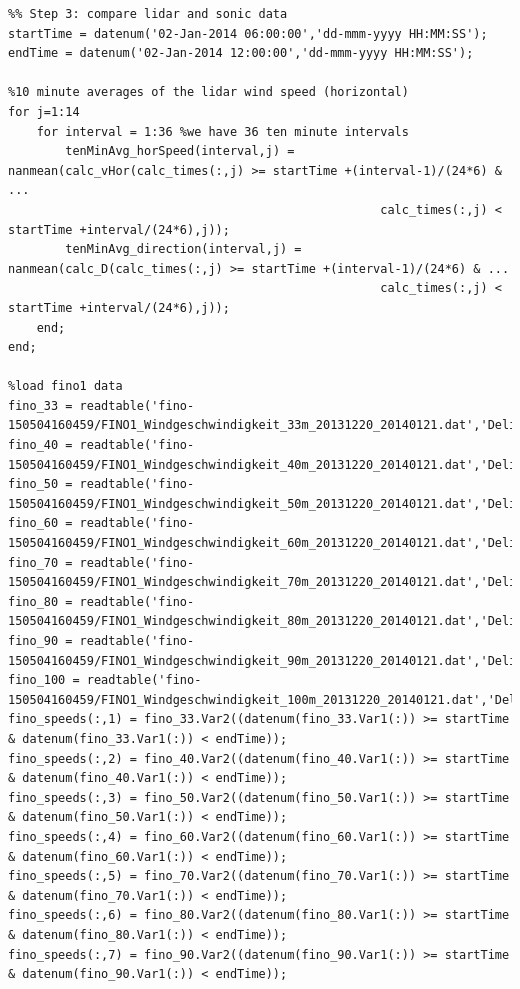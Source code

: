\documentclass[10pt]{article}
\begin{document}
\begin{lstlisting}
%% Step 3: compare lidar and sonic data
startTime = datenum('02-Jan-2014 06:00:00','dd-mmm-yyyy HH:MM:SS');
endTime = datenum('02-Jan-2014 12:00:00','dd-mmm-yyyy HH:MM:SS');

%10 minute averages of the lidar wind speed (horizontal) 
for j=1:14
    for interval = 1:36 %we have 36 ten minute intervals
        tenMinAvg_horSpeed(interval,j) = nanmean(calc_vHor(calc_times(:,j) >= startTime +(interval-1)/(24*6) & ... 
                                                    calc_times(:,j) < startTime +interval/(24*6),j));
        tenMinAvg_direction(interval,j) = nanmean(calc_D(calc_times(:,j) >= startTime +(interval-1)/(24*6) & ... 
                                                    calc_times(:,j) < startTime +interval/(24*6),j));
    end;
end;

%load fino1 data
fino_33 = readtable('fino-150504160459/FINO1_Windgeschwindigkeit_33m_20131220_20140121.dat','Delimiter','tab','HeaderLines',6);
fino_40 = readtable('fino-150504160459/FINO1_Windgeschwindigkeit_40m_20131220_20140121.dat','Delimiter','tab','HeaderLines',6);
fino_50 = readtable('fino-150504160459/FINO1_Windgeschwindigkeit_50m_20131220_20140121.dat','Delimiter','tab','HeaderLines',6);
fino_60 = readtable('fino-150504160459/FINO1_Windgeschwindigkeit_60m_20131220_20140121.dat','Delimiter','tab','HeaderLines',6);
fino_70 = readtable('fino-150504160459/FINO1_Windgeschwindigkeit_70m_20131220_20140121.dat','Delimiter','tab','HeaderLines',6);
fino_80 = readtable('fino-150504160459/FINO1_Windgeschwindigkeit_80m_20131220_20140121.dat','Delimiter','tab','HeaderLines',6);
fino_90 = readtable('fino-150504160459/FINO1_Windgeschwindigkeit_90m_20131220_20140121.dat','Delimiter','tab','HeaderLines',6);
fino_100 = readtable('fino-150504160459/FINO1_Windgeschwindigkeit_100m_20131220_20140121.dat','Delimiter','tab','HeaderLines',8);
fino_speeds(:,1) = fino_33.Var2((datenum(fino_33.Var1(:)) >= startTime & datenum(fino_33.Var1(:)) < endTime));
fino_speeds(:,2) = fino_40.Var2((datenum(fino_40.Var1(:)) >= startTime & datenum(fino_40.Var1(:)) < endTime));
fino_speeds(:,3) = fino_50.Var2((datenum(fino_50.Var1(:)) >= startTime & datenum(fino_50.Var1(:)) < endTime));
fino_speeds(:,4) = fino_60.Var2((datenum(fino_60.Var1(:)) >= startTime & datenum(fino_60.Var1(:)) < endTime));
fino_speeds(:,5) = fino_70.Var2((datenum(fino_70.Var1(:)) >= startTime & datenum(fino_70.Var1(:)) < endTime));
fino_speeds(:,6) = fino_80.Var2((datenum(fino_80.Var1(:)) >= startTime & datenum(fino_80.Var1(:)) < endTime));
fino_speeds(:,7) = fino_90.Var2((datenum(fino_90.Var1(:)) >= startTime & datenum(fino_90.Var1(:)) < endTime));

\end{lstlisting}
\end{document}
